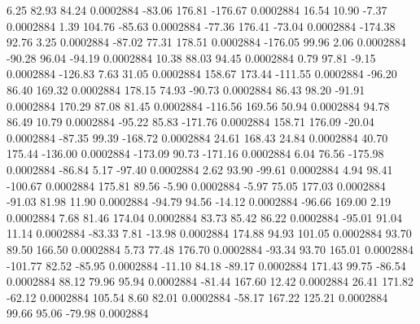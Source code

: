         6.25       82.93       84.24     0.0002884
      -83.06      176.81     -176.67     0.0002884
       16.54       10.90       -7.37     0.0002884
        1.39      104.76      -85.63     0.0002884
      -77.36      176.41      -73.04     0.0002884
     -174.38       92.76        3.25     0.0002884
      -87.02       77.31      178.51     0.0002884
     -176.05       99.96        2.06     0.0002884
      -90.28       96.04      -94.19     0.0002884
       10.38       88.03       94.45     0.0002884
        0.79       97.81       -9.15     0.0002884
     -126.83        7.63       31.05     0.0002884
      158.67      173.44     -111.55     0.0002884
      -96.20       86.40      169.32     0.0002884
      178.15       74.93      -90.73     0.0002884
       86.43       98.20      -91.91     0.0002884
      170.29       87.08       81.45     0.0002884
     -116.56      169.56       50.94     0.0002884
       94.78       86.49       10.79     0.0002884
      -95.22       85.83     -171.76     0.0002884
      158.71      176.09      -20.04     0.0002884
      -87.35       99.39     -168.72     0.0002884
       24.61      168.43       24.84     0.0002884
       40.70      175.44     -136.00     0.0002884
     -173.09       90.73     -171.16     0.0002884
        6.04       76.56     -175.98     0.0002884
      -86.84        5.17      -97.40     0.0002884
        2.62       93.90      -99.61     0.0002884
        4.94       98.41     -100.67     0.0002884
      175.81       89.56       -5.90     0.0002884
       -5.97       75.05      177.03     0.0002884
      -91.03       81.98       11.90     0.0002884
      -94.79       94.56      -14.12     0.0002884
      -96.66      169.00        2.19     0.0002884
        7.68       81.46      174.04     0.0002884
       83.73       85.42       86.22     0.0002884
      -95.01       91.04       11.14     0.0002884
      -83.33        7.81      -13.98     0.0002884
      174.88       94.93      101.05     0.0002884
       93.70       89.50      166.50     0.0002884
        5.73       77.48      176.70     0.0002884
      -93.34       93.70      165.01     0.0002884
     -101.77       82.52      -85.95     0.0002884
      -11.10       84.18      -89.17     0.0002884
      171.43       99.75      -86.54     0.0002884
       88.12       79.96       95.94     0.0002884
      -81.44      167.60       12.42     0.0002884
       26.41      171.82      -62.12     0.0002884
      105.54        8.60       82.01     0.0002884
      -58.17      167.22      125.21     0.0002884
       99.66       95.06      -79.98     0.0002884

